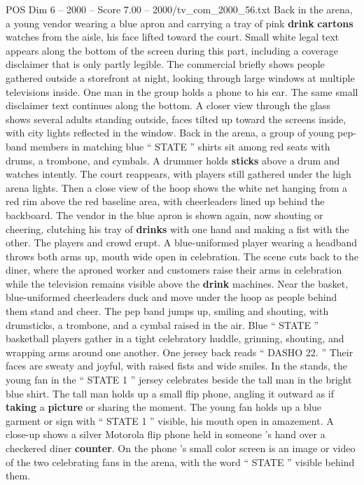 \begin{textsample}{POS Dim 6 – 2000 – Score 7.00 – 2000/tv\_com\_2000\_56.txt}
Back in the arena, a young vendor wearing a blue apron and carrying a tray of pink \textbf{drink} \textbf{cartons} watches from the aisle, his face lifted toward the court.
Small white legal text appears along the bottom of the screen during this part, including a coverage disclaimer that is only partly legible.
The commercial briefly shows people gathered outside a storefront at night, looking through large windows at multiple televisions inside.
One man in the group holds a phone to his ear.
The same small disclaimer text continues along the bottom.
A closer view through the glass shows several adults standing outside, faces tilted up toward the screens inside, with city lights reflected in the window.
Back in the arena, a group of young pep-band members in matching blue “ STATE ” shirts sit among red seats with drums, a trombone, and cymbals.
A drummer holds \textbf{sticks} above a drum and watches intently.
The court reappears, with players still gathered under the high arena lights.
Then a close view of the hoop shows the white net hanging from a red rim above the red baseline area, with cheerleaders lined up behind the backboard.
The vendor in the blue apron is shown again, now shouting or cheering, clutching his tray of \textbf{drinks} with one hand and making a fist with the other.
The players and crowd erupt.
A blue-uniformed player wearing a headband throws both arms up, mouth wide open in celebration.
The scene cuts back to the diner, where the aproned worker and customers raise their arms in celebration while the television remains visible above the \textbf{drink} machines.
Near the basket, blue-uniformed cheerleaders duck and move under the hoop as people behind them stand and cheer.
The pep band jumps up, smiling and shouting, with drumsticks, a trombone, and a cymbal raised in the air.
Blue “ STATE ” basketball players gather in a tight celebratory huddle, grinning, shouting, and wrapping arms around one another.
One jersey back reads “ DASHO 22. ” Their faces are sweaty and joyful, with raised fists and wide smiles.
In the stands, the young fan in the “ STATE 1 ” jersey celebrates beside the tall man in the bright blue shirt.
The tall man holds up a small flip phone, angling it outward as if \textbf{taking} a \textbf{picture} or sharing the moment.
The young fan holds up a blue garment or sign with “ STATE 1 ” visible, his mouth open in amazement.
A close-up shows a silver Motorola flip phone held in someone ’s hand over a checkered diner \textbf{counter}.
On the phone ’s small color screen is an image or video of the two celebrating fans in the arena, with the word “ STATE ” visible behind them.

\end{textsample}
